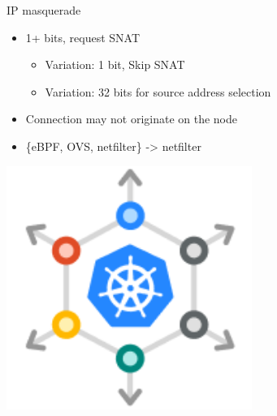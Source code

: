 \documentclass[black,white,aspectratio=169]{beamer}
\DeclareRobustCommand{\#}{\adjustbox{valign=B,totalheight=.57\baselineskip}{\oldhash}}%
\begin{document}
    \begin{frame}{IP masquerade}
        \begin{table}
            \begin{subtable}[l]{0.7\textwidth}
        \begin{itemize}
            \item 1+ bits, request SNAT~\smallskip
            \begin{itemize}
                \item Variation: 1 bit, Skip SNAT~\smallskip
                \item Variation: 32 bits for source address selection~\medskip
            \end{itemize}
            \item Connection may not originate on the node~\medskip
            \item \{eBPF, OVS, netfilter\} -> netfilter~\medskip
        \end{itemize}
            \end{subtable}
            \begin{subtable}[r]{0.2\textwidth}
                \includegraphics[width=0.6\textwidth]{scale.png}
            \end{subtable}
        \end{table}
    \end{frame}
\end{document}
